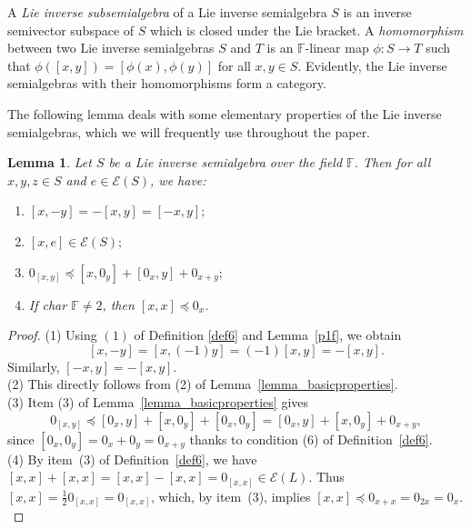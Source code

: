 \documentclass{amsart}
\newcommand{\E}{\mathcal{E}}
\newcommand{\F}{\mathbb{F}}
\newcommand{\0}{{\vartheta}}
\newtheorem{lem}[thm]{Lemma}
\theoremstyle{definition}
\theoremstyle{remark}
\numberwithin{equation}{section}
\newtheorem*{Theorem A}{\textbf{Theorem A}}
\newtheorem*{Corollary E}{\textbf{Corollary E}}
\newtheorem*{Corollary F}{\textbf{Corollary F}}
\newtheorem*{Theorem B}{\textbf{Theorem B}}
\newtheorem*{Theorem C}{\textbf{Theorem C}}
\newtheorem*{Theorem D}{\textbf{Theorem B}}
\newtheorem*{p a}{\textbf{Proof of  Theorem A}}
\newtheorem*{p b}{\textbf{Proof of Theorem B}}
\newtheorem*{p c}{\textbf{Proof of  Theorem C}}
\newtheorem*{p d}{\textbf{Proof of  Theorem D}}
\begin{document}
 
 A {\em Lie inverse subsemialgebra} of a Lie inverse semialgebra $S$ is an inverse semivector subspace of $S$ which is closed under the Lie bracket. A  {\em homomorphism} between two Lie inverse semialgebras $S$ and $T$ is an $\F$-linear map $\phi: S\to T$ such that $\phi([x,y])=[\phi(x),\phi(y)]$ for all $x,y\in S$. Evidently, the Lie inverse semialgebras with their homomorphisms form a category. 

The following lemma deals with some elementary properties of the Lie inverse semialgebras, which we will frequently use throughout the paper.

\begin{lem}\label{lemma-basicprop}
 Let $S$ be a Lie inverse semialgebra over the field $\mathbb{F}$. Then  for all $x,y,z\in S$ and $e \in \E(S)$, we have:
\begin{enumerate}
    \item $[x,-y]=- [x,y]=[-x,y];$
    \item $[x,e]\in \E(S);$ 
    \item $0_{[x,y]}\preceq [x,0_y]+[0_x,y]+0_{x+y};$
    \item If {\rm char} $\F \neq 2$, then $[x,x]\preceq 0_x$.
\end{enumerate}
\end{lem}
\begin{proof}

(1)  Using  $(1)$ of Definition \ref{def6}   and Lemma~\ref{p1f}, we obtain
  $$  [x,-y]= [x,(-1)y]=(-1)[x,y]=-[x,y].$$  
Similarly, $[-x,y]=-[x,y].$\\


\noindent (2) This directly follows from (2) of  Lemma~\ref{lemma_basicproperties}.\\


\noindent (3)  Item (3) of  Lemma~\ref{lemma_basicproperties} gives
$$0_{[x,y]} \preceq  [0_x,y]+[x,0_y]+  [0_x, 0_y] =  [0_x,y]+[x,0_y] + 0_{x+y},$$ since  $ [0_x, 0_y] =  0_x + 0_y =    0_{x+y}$ thanks to condition (6) of
 Definition~\ref{def6}.\\





\noindent (4) By item~(3) of Definition~\ref{def6}, we have $[x,x]+[x,x]=[x,x]-[x,x]=0_{[x,x]}\in \E(L)$. Thus $[x,x]=\frac{1}{2}0_{[x,x]}=0_{[x,x]}$, which,   by item~(3), implies  $[x,x]\preceq 0_{x+x} = 0_{2x} = 0_x.$
\end{proof}
\end{document}

